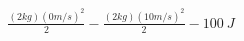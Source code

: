 \documentclass[preview]{standalone}
\begin{document}
\begin{align*}
\frac{(2 kg)(0 m/s)^2}{2} - \frac{(2 kg)(10 m/s)^2}{2} - 100 \ J
\end{align*}
\end{document}
